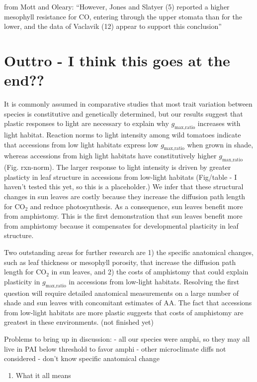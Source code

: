 \documentclass[
  letterpaper,
  DIV=11,
  numbers=noendperiod]{scrartcl}
\providecommand{\tightlist}{%
  \setlength{\itemsep}{0pt}\setlength{\parskip}{0pt}}\usepackage{longtable,booktabs,array}
\newcommand{\aax}{$\mathrm{AA}$}
\newcommand{\gmaxratio}{$g_\text{max,ratio}$}
\begin{document}
from Mott and Oleary: ``However, Jones and Slatyer (5) reported a higher
mesophyll resistance for CO, entering through the upper stomata than for
the lower, and the data of Vaclavik (12) appear to support this
conclusion''

\section{Outtro - I think this goes at the
end??}\label{outtro---i-think-this-goes-at-the-end}

It is commonly assumed in comparative studies that most trait variation
between species is constitutive and genetically determined, but our
results suggest that plastic responses to light are necessary to explain
why \gmaxratio{} increases with light habitat. Reaction norms to light
intensity among wild tomatoes indicate that accessions from low light
habitats express low \gmaxratio{} when grown in shade, whereas
accessions from high light habitats have constitutively higher
\gmaxratio{} (Fig. rxn-norm). The larger response to light intensity is
driven by greater plasticty in leaf structure in accessions from
low-light habitats (Fig/table - I haven't tested this yet, so this is a
placeholder.) We infer that these structural changes in sun leaves are
costly because they increase the diffusion path length for CO\(_2\) and
reduce photosynthesis. As a consequence, sun leaves benefit more from
amphistomy. This is the first demonstration that sun leaves benefit more
from amphistomy because it compensates for developmental plasticity in
leaf structure.

Two outstanding areas for further research are 1) the specific
anatomical changes, such as leaf thickness or mesophyll porosity, that
increase the diffusion path length for CO\(_2\) in sun leaves, and 2)
the costs of amphistomy that could explain plasticity in \gmaxratio{} in
accessions from low-light habitats. Resolving the first question will
require detailed anatomical measurements on a large number of shade and
sun leaves with concomitant estimates of \aax. The fact that accessions
from low-light habitats are more plastic suggests that costs of
amphistomy are greatest in these environments. (not finished yet)

Problems to bring up in discussion: - all our species were amphi, so
they may all live in PAI below threshold to favor amphi - other
microclimate diffs not considered - don't know specific anatomical
change

\begin{enumerate}
\def\labelenumi{\arabic{enumi}.}
\setcounter{enumi}{7}
\tightlist
\item
  What it all means
\end{enumerate}
\end{document}
